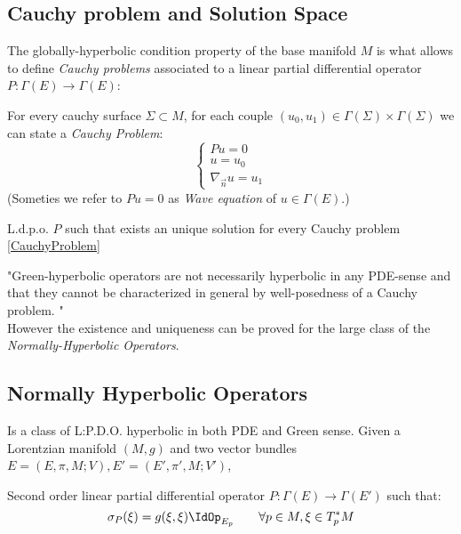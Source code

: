 \documentclass[a4paper,12pt]{scrartcl}    %
\begin{document}
	\subsection{Cauchy problem and Solution Space}
		The globally-hyperbolic condition property of the base manifold $M$ is what allows to define \emph{Cauchy problems} associated to a linear partial differential operator $P:\Gamma(E) \rightarrow \Gamma(E)$:
		\begin{remark}
			For every cauchy surface $\Sigma \subset M$, for each couple $(u_0, u_1) \in \Gamma(\Sigma) \times \Gamma(\Sigma)$ we can state a \emph{Cauchy Problem}:
			\begin{equation}\label{CauchyProblem}
				\begin{cases} P u = 0 \\ u = u_0 \\ \nabla_{\vec{n}}u= u_1 \end{cases}
			\end{equation}
			(Someties we refer to $P u = 0$ as \emph{Wave equation} of $u\in \Gamma(E)$.)
		\end{remark}
		\begin{definition}
			L.d.p.o. $P$ such that exists an unique solution for every Cauchy problem \ref{CauchyProblem}
		\end{definition}

	\begin{observation}
	"Green-hyperbolic operators are not necessarily hyperbolic in any PDE-sense and that they cannot be characterized in general by well-posedness of a Cauchy problem.	" \cite{Terlaky2010} \cite{Bar2010}
	\\
	However the existence and uniqueness can be proved for the large class of the \emph{Normally-Hyperbolic Operators}.
	\end{observation}

	\subsection{Normally Hyperbolic Operators}
		Is a class of L:P.D.O. hyperbolic in both PDE and Green sense.
		Given a Lorentzian manifold $(M,g)$ and two vector bundles $E=(E,\pi,M;V), E'=(E',\pi',M;V')$,
		\begin{definition}
			Second order linear partial differential operator $P:\Gamma(E)\rightarrow \Gamma(E')$ such that:
			\begin{displaymath}
				\sigma_P(\xi) = g(\xi,\xi) \IdOp_{E_p} \qquad \forall p\in M, \xi \in T^*_pM
			\end{displaymath}
		\end{definition}
		
\end{document}
